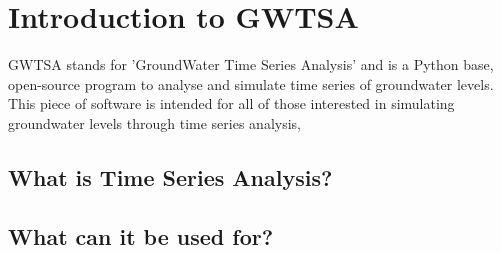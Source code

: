 \chapter{Introduction to GWTSA}
GWTSA stands for 'GroundWater Time Series Analysis' and is a Python base, open-source program to analyse and simulate time series of groundwater levels. This piece of software is intended for all of those interested in simulating groundwater levels through time series analysis, 

\section{What is Time Series Analysis?}

\section{What can it be used for?}

